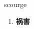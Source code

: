 
\begin{frame}
{\huge scourge}
\begin{center}
\begin{enumerate}\Large
  \item \textbf{祸害}
\end{enumerate}
\end{center}
\end{frame}
